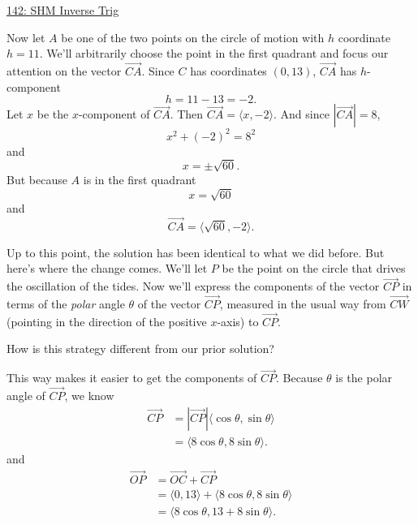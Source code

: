 \documentclass{ximera}
\begin{document}
\begin{question}
\begin{onlineOnly}
    \begin{center}
\end{center}
\end{onlineOnly}

\href{https://www.desmos.com/calculator/mytmutzt73}{142: SHM Inverse Trig}



Now let $A$ be one of the two points on the circle of motion with $h$ coordinate $h=11$. We'll arbitrarily choose the point in the first quadrant and focus our attention on the vector $\overrightarrow{CA}$. Since $C$ has coordinates $(0,13)$, $\overrightarrow{CA}$ has $h$-component
\[
    h = 11 - 13 = -2 .
\]
Let $x$ be the $x$-component of $\overrightarrow{CA}$. Then $\overrightarrow{CA} = \langle x, -2 \rangle$. And since $|\overrightarrow{CA}| = 8$,
\[
x^2 + (-2)^2 = 8^2
\]
and 
\[
  x = \pm \sqrt{60}.
\]
But because $A$ is in the first quadrant 
\[
    x = \sqrt{60}
\]
and
\[
\overrightarrow{CA} = \langle \sqrt{60},-2\rangle.
\]


Up to this point, the solution has been identical to what we did before. But here's where the change comes. We'll let $P$ be the point on the circle that drives the oscillation of the tides. Now we'll express the components of the vector $\overrightarrow{CP}$ in terms of the  \emph{polar} angle $\theta$ of the vector $\overrightarrow{CP}$, measured in the usual way from $\overrightarrow{CW}$ (pointing in the direction of the positive $x$-axis) to $\overrightarrow{CP}$. 

How is this strategy different from our prior solution?
\begin{freeResponse}
\end{freeResponse}

This way makes it easier to get the components of $\overrightarrow{CP}$. Because $\theta$ is the polar angle of $\overrightarrow{CP}$, we know
\begin{align*}
 \overrightarrow{CP} &=  \left| \overrightarrow{CP} \right| \langle \cos\theta , \sin\theta  \rangle    \\
                               &= \langle 8\cos\theta, 8 \sin\theta   \rangle .
\end{align*}
and
\begin{align*}
 \overrightarrow{OP}  &= \overrightarrow{OC} + \overrightarrow{CP} \\
                                &=\langle 0, 13\rangle + \langle 8\cos\theta, 8 \sin\theta   \rangle \\
                                & = \langle 8\cos\theta, 13 + 8 \sin\theta   \rangle . 
\end{align*}


\end{question}
\end{document}
